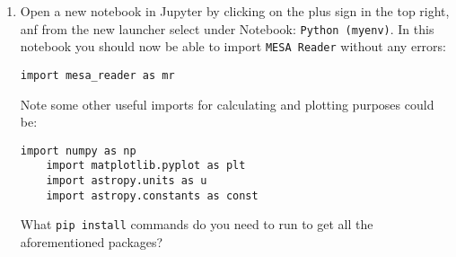 \documentclass[11pt,a4paper]{article}
\begin{document}
\begin{enumerate}
  
  \item Open a new notebook in Jupyter by clicking on the plus sign in the top right, anf from the new launcher select under Notebook: \texttt{Python (myenv)}.
  In this notebook you should now be able to import \texttt{MESA Reader} without any errors:
  \begin{lstlisting}[style=pythonstyle]
  import mesa_reader as mr
  \end{lstlisting}

  Note some other useful imports for calculating and plotting purposes could be:
  \begin{lstlisting}[style=pythonstyle]
    import numpy as np
    import matplotlib.pyplot as plt
    import astropy.units as u
    import astropy.constants as const
  \end{lstlisting}

  What \texttt{pip install} commands do you need to run to get all the aforementioned packages? 

\end{enumerate}




\end{document}
